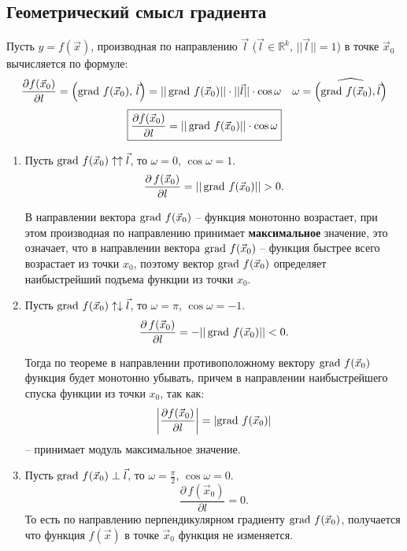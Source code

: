 \subsection{Геометрический смысл градиента}
Пусть $y = f(\vec{x})$, производная по направлению $\vec{l}$ ($\vec{l} \in \mathbb{R}^k$, $||\vec{l}|| = 1$) в точке $\vec{x}_0$ вычисляется по формуле:
\begin{align*}
	\frac{\partial f(\vec{x}_0)}{\partial l} = \left(\operatorname{grad} \, f(\vec{x}_0), \, \vec{l}\right) = ||\operatorname{grad} \, f(\vec{x}_0)|| \cdot ||\vec{l}|| \cdot \cos \omega && \omega = \widehat{\left(\operatorname{grad} \, f(\vec{x}_0), \vec{l}\right)}
\end{align*}
\begin{equation*}
	\boxed{\frac{\partial f(\vec{x}_0)}{\partial l} = ||\operatorname{grad} \, f(\vec{x}_0)|| \cdot \cos \omega}
\end{equation*}

\begin{enumerate}
	\item Пусть $\operatorname{grad} \, f(\vec{x}_0) \uparrow \uparrow \vec{l}$, то $\omega = 0$, $\cos \omega = 1$.
	\begin{equation*}
		\frac{\partial \, f(\vec{x}_0)}{\partial l} = ||\operatorname{grad} \, f(\vec{x}_0)|| > 0.
	\end{equation*}

	В направлении вектора $\operatorname{grad} \, f(\vec{x}_0)$ -- функция монотонно возрастает, при этом производная по направлению принимает \textbf{максимальное} значение, это означает, что в направлении вектора $\operatorname{grad} \, f(\vec{x}_0)$ -- функция быстрее всего возрастает из точки $x_0$, поэтому вектор $\operatorname{grad} \, f(\vec{x}_0)$ определяет наибыстрейший подъема функции из точки $x_0$.

	\item Пусть $\operatorname{grad} \, f(\vec{x}_0) \uparrow \downarrow \vec{l}$, то $\omega = \pi$, $\cos \omega = -1$.
	\begin{equation*}
		\frac{\partial \, f(\vec{x}_0)}{\partial l} = -||\operatorname{grad} \, f(\vec{x}_0)|| < 0.
	\end{equation*}

	Тогда по теореме в направлении противоположному вектору $\operatorname{grad} \, f(\vec{x}_0)$ функция будет монотонно убывать, причем в направлении наибыстрейшего спуска функции из точки $x_0$, так как:
	\begin{equation*}
		\left|\frac{\partial f(\vec{x}_0)}{\partial l}\right| = \left|\operatorname{grad} \, f(\vec{x}_0)\right|
	\end{equation*}
	-- принимает модуль максимальное значение.
	\item Пусть $\operatorname{grad} \, f(\vec{x}_0) \perp \vec{l}$, то $\omega = \frac{\pi}{2}$, $\cos \omega = 0$.
	\begin{equation*}
		\frac{\partial \, f(\vec{x}_0)}{\partial l} = 0.
	\end{equation*}
	То есть по направлению перпендикулярном градиенту $\operatorname{grad} \, f(\vec{x}_0)$, получается что функция $f(\vec{x})$ в точке $\vec{x}_0$ функция не изменяется.
\end{enumerate}
